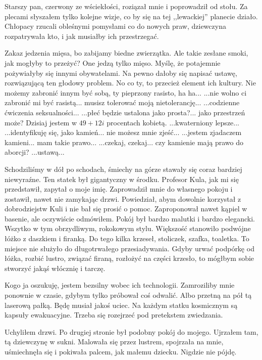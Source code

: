 Starszy pan, czerwony ze wściekłości, roziązał mnie i poprowadził od stołu. 
Za plecami słyszałem tylko kolejne wizje, co by się na tej ,,lewackiej'' planecie działo.
Chłopacy rzucali obleśnymi pomysłami co do nowych praw, dziewczyna rozpatrywała kto, i jak musiałby ich przestrzegać.
\begin{dialogue}
\ds{} Zakaz jedzenia mięsa, bo zabijamy biedne zwierzątka.
\ds{} Ale takie zesłane smoki, jak mogłyby to przeżyć? One jedzą tylko mięso.
\ds{} Myślę, że potajemnie pożywiałyby się innymi obywatelami.
\ds{} Na pewno dałoby się napisać ustawę, rozwiązującą ten głodowy problem.
\ds{} No co ty, to przecież element ich kultury. Nie możemy zabronić innym być sobą, ty pieprzony rasisto, ha ha...
\ds{} ...nie wolno ci zabronić mi być rasistą... musisz tolerować moją nietolerancję...
\ds{} ...codzienne ćwiczenia seksualności...
\ds{} ...płeć będzie ustalona jako prosta?... jako przestrzeń może?
\ds{} Dzisiaj jestem w $49 + 12i$ procentach kobietą.
\ds{} ...kwaterniony lepsze...
\ds{} ...identyfikuję się, jako kamień... nie możesz mnie zjeść...
\ds{} ...jestem zjadaczem kamieni... mam takie prawo...
\ds{} ...czekaj, czekaj... czy kamienie mają prawo do aborcji?
\ds{} ...ustawą...
\end{dialogue}

Schodziliśmy w dół po schodach, śmiechy na górze stawały się coraz bardziej niewyraźne.
Ten statek był gigantyczny w środku. Profesor Kula, jak mi się przedstawił, zapytał o moje imię.
Zaprowadził mnie do własnego pokoju i zostawił, nawet nie zamykając drzwi. 
Powiedział, abym dowolnie korzystał z dobrodziejstw Kuli i nie bał się prosić o pomoc. 
Zaproponował nawet kąpiel w basenie, ale oczywiście odmówiłem.
Pokój był bardzo malutki i bardzo elegancki.
Wszytko w tym obrzydliwym, rokokowym stylu.
Większość stanowiło podwójne łóżko z daszkiem i firanką.
Do tego kilka krzeseł, stoliczek, szafka, toaletka.
To miejsce nie służyło do długotrwałego przesiadywania.
Gdyby urwać podpórkę od łóżka, rozbić lustro, związać firaną, rozłożyć na części krzesło, to mógłbym sobie stworzyć jakąś włócznię i tarczę.

Kogo ja oszukuję, jestem bezsilny wobec ich technologii.
Zamroziliby mnie ponownie w czasie, gdybym tylko próbował coś odwalić.
Albo przetną na pół tą laserową pałką.
Będę musiał jakoś uciec. Na każdym statku kosmicznym są kapsuły ewakuacyjne.
Trzeba się rozejrzeć pod pretekstem zwiedzania.

Uchyliłem drzwi. Po drugiej stronie był podobny pokój do mojego.
Ujrzałem tam, tą dziewczynę w sukni.
Malowała się przez lustrem, spojrzała na mnie, uśmiechnęła się i pokiwała palcem, jak małemu dziecku.
Nigdzie nie pójdę.

